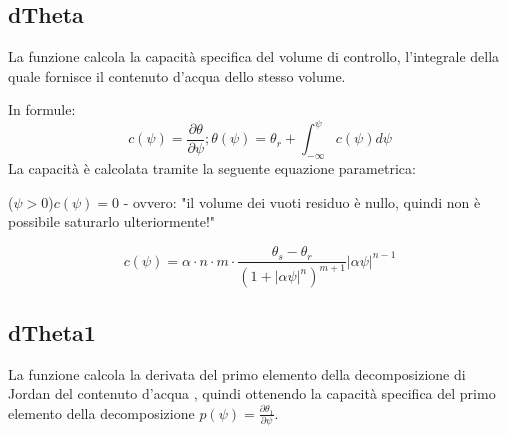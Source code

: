\documentclass[
10pt, %
a4paper, %
oneside, %
headinclude,footinclude, %
BCOR5mm, %
]{scrartcl}
\begin{document}
	\subsection{dTheta}
		La funzione calcola la capacità specifica del volume di controllo, l'integrale della quale fornisce il 
		contenuto d'acqua dello stesso volume.

		In formule:
		\begin{equation}
			c(\psi) = \frac{\partial \theta}{\partial \psi} ; \theta(\psi) = \theta_{r} + \int_{-\infty}^{\psi}c(\psi)d\psi
			\label{eq:speccap}
		\end{equation}
		La capacità è calcolata tramite la seguente equazione parametrica:
		\begin{description}\itemsep0pt
			\item[in saturazione] ($\psi > 0$)\newline $c(\psi) = 0$ - ovvero: "il volume dei vuoti residuo è nullo, quindi non è possibile
			saturarlo ulteriormente!"
			\item[nella zona insatura]
			\begin{equation}
				c(\psi) = \alpha\cdot n \cdot m \cdot \frac{\theta_{s} - \theta_{r}}{(1+|\alpha\psi|^{n})^{m+1}}|\alpha\psi|^{n-1}
			\end{equation}
		\end{description}

	\subsection{dTheta1}
	\label{subs:theta1}
		La funzione calcola la derivata del primo elemento della decomposizione di Jordan del contenuto d'acqua , quindi ottenendo la 
		capacità specifica del primo elemento della decomposizione $p(\psi)=\frac{\partial\theta_{1}}{\partial\psi}$.
\end{document}
